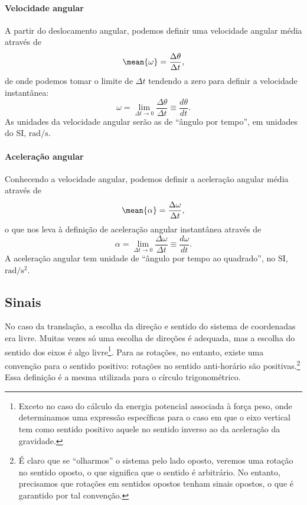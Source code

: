\paragraph{Velocidade angular}

A partir do deslocamento angular, podemos definir uma velocidade angular média através de
\begin{equation}
	\mean{\omega} = \frac{\Delta\theta}{\Delta t},
\end{equation}
%
de onde podemos tomar o limite de $\Delta t$ tendendo a zero para definir a velocidade instantânea:
\begin{equation}
	\omega = \lim_{\Delta t \to 0} \frac{\Delta\theta}{\Delta t} \equiv \frac{d\theta}{dt}.
\end{equation}
%
As unidades da velocidade angular serão as de ``ângulo por tempo'', em unidades do SI, $\textrm{rad}/\textrm{s}$.

\paragraph{Aceleração angular}

Conhecendo a velocidade angular, podemos definir a aceleração angular média através de
\begin{equation}
	\mean{\alpha} = \frac{\Delta \omega}{\Delta t},
\end{equation}
%
o que nos leva à definição de aceleração angular instantânea através de
\begin{equation}
	\alpha = \lim_{\Delta t \to 0} \frac{\Delta\omega}{\Delta t} \equiv \frac{d\omega}{dt}.
\end{equation}
%
A aceleração angular tem unidade de ``ângulo por tempo ao quadrado'', no SI, $\textrm{rad}/\textrm{s}^2$.

\subsection{Sinais}

No caso da translação, a escolha da direção e sentido do sistema de coordenadas era livre. Muitas vezes só uma escolha de direções é adequada, mas a escolha do sentido dos eixos é algo livre\footnote{Exceto no caso do cálculo da energia potencial associada à força peso, onde determinamos uma expressão específicas para o caso em que o eixo vertical tem como sentido positivo aquele no sentido inverso ao da aceleração da gravidade.}. Para as rotações, no entanto, existe uma convenção para o sentido positivo: rotações no sentido anti-horário são positivas.\footnote{É claro que se ``olharmos'' o sistema pelo lado oposto, veremos uma rotação no sentido oposto, o que significa que o sentido é arbitrário. No entanto, precisamos que rotações em sentidos opostos tenham sinais opostos, o que é garantido por tal convenção.} Essa definição é a mesma utilizada para o círculo trigonométrico.

